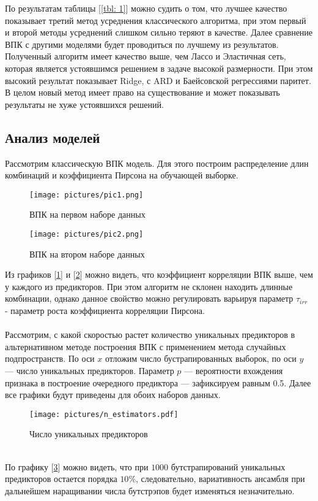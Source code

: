 \documentclass{article}
\begin{document}
По результатам таблицы [\ref{tbl: 1}] можно судить о том, что лучшее качество показывает третий метод усреднения классического алгоритма, при этом первый и второй методы усреднений слишком сильно теряют в качестве. Далее сравнение ВПК с другими моделями будет проводиться по лучшему из результатов. Полученный алгоритм имеет качество выше, чем Лассо и Эластичная сеть, которая является устоявшимся решением в задаче высокой размерности. При этом высокий результат показывает Ridge, с ARD и Баейсовской регрессиями паритет. В целом новый метод имеет право на существование и может показывать результаты не хуже устоявшихся решений. 
\subsection{Анализ моделей}
Рассмотрим классическую ВПК модель. Для этого построим распределение длин комбинаций и коэффициента Пирсона на обучающей выборке.
\begin{figure}[!htb]
    \centering
    \texttt{[image: pictures/pic1.png]}
    \caption{ВПК на первом наборе данных}
    \label{pic 1}
\end{figure}
\newpage
\begin{figure}[!htb]
    \centering
    \texttt{[image: pictures/pic2.png]}
    \caption{ВПК на втором наборе данных}
    \label{pic 2}
\end{figure}
Из графиков [\ref{pic 1}] и [\ref{pic 2}] можно видеть, что коэффициент корреляции ВПК выше, чем у каждого из предикторов. При этом алгоритм не склонен находить длинные комбинации, однако данное свойство можно регулировать варьируя параметр $\tau_{irr}$ - параметр роста коэффициента корреляции Пирсона. \\ \\
Рассмотрим, с какой скоростью растет количество уникальных предикторов в альтернативном методе построения ВПК с применением метода случайных подпространств. По оси $x$ отложим число бустрапированных выборок, по оси $y$ — число уникальных предикторов. Параметр $p$ — вероятности вхождения признака в построение очередного предиктора — зафиксируем равным 0.5. Далее все графики будут приведены для обоих наборов данных.
\begin{figure}[!htb]
    \centering
    \texttt{[image: pictures/n\_estimators.pdf]}
    \caption{Число уникальных предикторов}
    \label{Pic 3}
\end{figure}\\
По графику [\ref{Pic 3}] можно видеть, что при $1000$ бутстрапирований уникальных предикторов остается порядка $10\%$, следовательно, вариативность ансамбля при дальнейшем наращивании числа бутстрэпов будет изменяться незначительно. 
\end{document}
